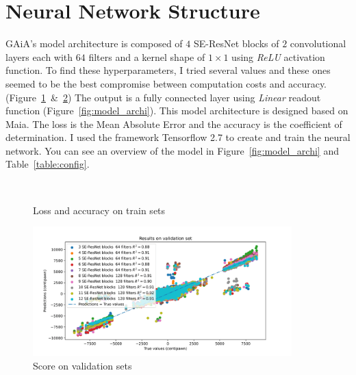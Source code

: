 \documentclass[unnumsec,webpdf,contemporary,large]{Article}%
\theoremstyle{thmstyleone}%
\theoremstyle{thmstyletwo}%
\theoremstyle{thmstylethree}%
\begin{document}
\section{Neural Network Structure}
GAiA's model architecture is composed of $4$ SE-ResNet blocks of $2$ convolutional layers
each with $64$ filters and a kernel shape of $1\times1$ using \textit{ReLU} activation function.
To find these hyperparameters, I tried several values and these ones seemed to be
the best compromise between computation costs and accuracy.
(Figure~\ref{fig:acc_loss}~\&~\ref{fig:score_valid})
The output is a fully connected layer using \textit{Linear} readout function (Figure~\ref{fig:model_archi}).
This model architecture is designed based on Maia\cite{maia}.
The loss is the Mean Absolute Error\cite{mae} and the accuracy is the coefficient of determination\cite{r2}.
I used the framework Tensorflow 2.7\cite{tensorflow} to create and train the neural network.
You can see an overview of the model in Figure~\ref{fig:model_archi} and Table~\ref{table:config}.

\begin{figure}[H]
  \captionsetup[subfigure]{labelformat=empty}
  \centering
  \\
  \caption{Loss and accuracy on train sets}
  \label{fig:acc_loss}
\end{figure}

\begin{figure}[H]
  \centering
  \includegraphics[width=10cm]{model_selection_2.png}
  \caption{Score on validation sets}
  \label{fig:score_valid}
\end{figure}
\end{document}
